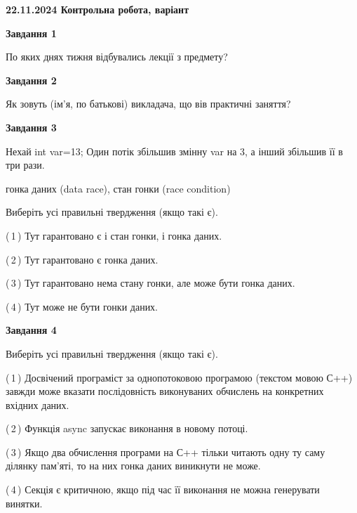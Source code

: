 \documentclass[12pt, ukrainian]{article}
\begin{document}
\begin {large}

\textbf{22.11.2024 Контрольна робота, варіант  }\par


{

\begin{center}
\textbf{Завдання 1}
\end{center}

По яких днях тижня відбувались лекції з предмету?


\begin{center}
\textbf{Завдання 2}
\end{center}

Як зовуть (ім'я, по батькові) викладача, що вів практичні заняття?


\begin{center}
\textbf{Завдання 3}
\end{center}

Нехай int var=13; Один потік збільшив змінну var на 3, а інший збільшив її в три рази.

гонка даних (data race), стан гонки (race condition)

Виберіть усі правильні твердження (якщо такі є).\par
\vspace{2mm}
(\,1\,) Тут гарантовано є і стан гонки, і гонка даних.%

(\,2\,) Тут гарантовано є гонка даних.%

(\,3\,) Тут гарантовано нема стану гонки, але може бути гонка даних.%

(\,4\,) Тут може не бути гонки даних.%


\begin{center}
\textbf{Завдання 4}
\end{center}

Виберіть усі правильні твердження (якщо такі є).\par
\vspace{2mm}

(\,1\,) Досвічений програміст за однопотоковою програмою (текстом мовою С++) завжди може вказати послідовність виконуваних обчислень на конкретних вхідних даних.%

(\,2\,) Функція async запускає виконання в новому потоці.%

(\,3\,) Якщо два обчислення програми на С++ тільки читають одну ту саму ділянку пам'яті, то на них гонка даних  виникнути не може.%

(\,4\,) Секція є критичною, якщо під час її виконання не можна генерувати винятки.%


}
\end{large}
\end{document}
